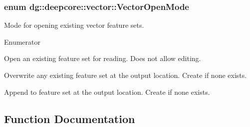 \subsubsection[{\texorpdfstring{Vector\+Open\+Mode}{VectorOpenMode}}]{\setlength{\rightskip}{0pt plus 5cm}enum {\bf dg\+::deepcore\+::vector\+::\+Vector\+Open\+Mode}}\hypertarget{group___vector_module_ga1ee9d7536b27c1a7852203d093939d2b}{}\label{group___vector_module_ga1ee9d7536b27c1a7852203d093939d2b}


Mode for opening existing vector feature sets. 

\begin{Desc}
\item[Enumerator]\par
\begin{description}
\item[{\em 
R\+E\+A\+D\+O\+N\+LY\hypertarget{group___vector_module_gga1ee9d7536b27c1a7852203d093939d2ba7d737e43c359af32ce26dc7a7b575041}{}\label{group___vector_module_gga1ee9d7536b27c1a7852203d093939d2ba7d737e43c359af32ce26dc7a7b575041}
}]Open an existing feature set for reading. Does not allow editing. \item[{\em 
O\+V\+E\+R\+W\+R\+I\+TE\hypertarget{group___vector_module_gga1ee9d7536b27c1a7852203d093939d2ba856418f517d622ab3225c83be2acad14}{}\label{group___vector_module_gga1ee9d7536b27c1a7852203d093939d2ba856418f517d622ab3225c83be2acad14}
}]Overwrite any existing feature set at the output location. Create if none exists. \item[{\em 
A\+P\+P\+E\+ND\hypertarget{group___vector_module_gga1ee9d7536b27c1a7852203d093939d2ba95e2fcaeac8c9a847f1c98f9b799201f}{}\label{group___vector_module_gga1ee9d7536b27c1a7852203d093939d2ba95e2fcaeac8c9a847f1c98f9b799201f}
}]Append to feature set at the output location. Create if none exists. \end{description}
\end{Desc}


\subsection{Function Documentation}
